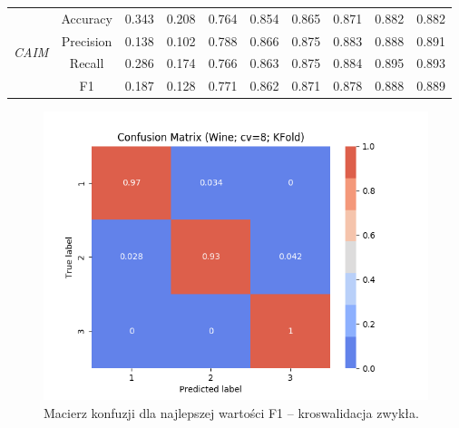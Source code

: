\begin{table}[H]
\begin{tabular}{|c|c|c|c|c|c|c|c|c|c|}
                                            \multirow{4}{*}{\textit{CAIM}}  & Accuracy & 0.343 & 0.208 & 0.764 & 0.854 & 0.865 & 0.871 & 0.882 & 0.882 \\ \cline{2-10}
                                             & Precision & 0.138 & 0.102 & 0.788 & 0.866 & 0.875 & 0.883 & 0.888 & 0.891 \\ \cline{2-10}
                                             & Recall & 0.286 & 0.174 & 0.766 & 0.863 & 0.875 & 0.884 & 0.895 & 0.893 \\ \cline{2-10}
                                             & F1 & 0.187 & 0.128 & 0.771 & 0.862 & 0.871 & 0.878 & 0.888 & 0.889 \\ \hline \hline

            \hline
        \end{tabular}
    \end{table}

\begin{figure}[H]
    \includegraphics[width=\textwidth]{img/conf_matrices/cm_Wine_cv8_KFold.png}
    \caption{Macierz konfuzji dla najlepszej wartości F1 -- kroswalidacja zwykła.}
\end{figure}